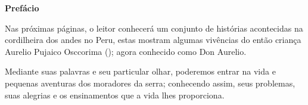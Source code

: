 \cleardoublepage
\newpage
\thispagestyle{empty}

\vfill
\begin{center}
\textbf{\LARGE  Prefácio }
\end{center}
Nas próximas páginas, o leitor conhecerá um conjunto de histórias acontecidas na cordilheira dos andes no Peru, estas mostram algumas vivências do então criança Aurelio Pujaico Osccorima (\Aulicha);
agora conhecido como Don Aurelio.

Mediante suas palavras e seu particular olhar, poderemos entrar na vida e pequenas aventuras dos moradores da serra; conhecendo assim, seus problemas, suas alegrias e os ensinamentos que a vida lhes proporciona. 
\vfill
